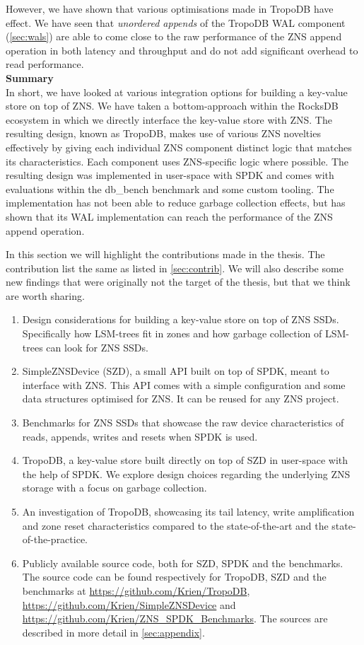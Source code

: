 However, we have shown that various optimisations made in TropoDB have effect. We have seen that \textit{unordered appends} of the TropoDB WAL component (\autoref{sec:wals}) are able to come close to the raw performance of the ZNS append operation in both latency and throughput and do not add significant overhead to read performance. 
\\
\textbf{Summary}\\
In short, we have looked at various integration options for building a key-value store on top of ZNS. We have taken a bottom-approach within the RocksDB ecosystem in which we directly interface the key-value store with ZNS. The resulting design, known as TropoDB, makes use of various ZNS novelties effectively by giving each individual ZNS component distinct logic that matches its characteristics. Each component uses ZNS-specific logic where possible. The resulting design was implemented in user-space with SPDK and comes with evaluations within the db\_bench benchmark and some custom tooling. The implementation has not been able to reduce garbage collection effects, but has shown that its WAL implementation can reach the performance of the ZNS append operation.

In this section we will highlight the contributions made in the thesis. The contribution list the same as listed in \autoref{sec:contrib}. We will also describe some new findings that were originally not the target of the thesis, but that we think are worth sharing.

\begin{enumerate}
    \item Design considerations for building a key-value store on top of ZNS SSDs. Specifically how LSM-trees fit in zones and how garbage collection of LSM-trees can look for ZNS SSDs.
    \item SimpleZNSDevice (SZD), a small API built on top of SPDK, meant to interface with ZNS. This API comes with a simple configuration and some data structures optimised for ZNS. It can be reused for any ZNS project.
    \item Benchmarks for ZNS SSDs that showcase the raw device characteristics of reads, appends, writes and resets when SPDK is used.
    \item TropoDB, a key-value store built directly on top of SZD in user-space with the help of SPDK. We explore design choices regarding the underlying ZNS storage with a focus on garbage collection. 
    \item An investigation of TropoDB, showcasing its tail latency, write amplification and zone reset characteristics compared to the state-of-the-art and the state-of-the-practice.
    \item Publicly available source code, both for SZD, SPDK and the benchmarks. The source code can be found respectively for TropoDB, SZD and the benchmarks at \url{https://github.com/Krien/TropoDB},  \url{https://github.com/Krien/SimpleZNSDevice} and \url{https://github.com/Krien/ZNS_SPDK_Benchmarks}. The sources are described in more detail in \autoref{sec:appendix}.
\end{enumerate}

